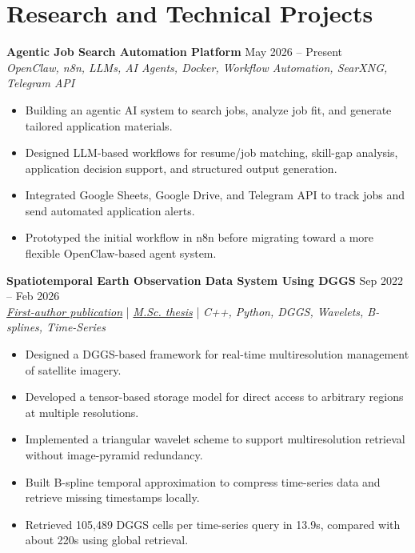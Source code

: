 \documentclass[a4paper,10pt]{article}
\begin{document}

\section*{Research and Technical Projects}

\noindent
\textbf{Agentic Job Search Automation Platform} \hfill May 2026 -- Present \\
\textit{OpenClaw, n8n, LLMs, AI Agents, Docker, Workflow Automation, SearXNG, Telegram API}
\begin{itemize}[leftmargin=0.25in]
    \item Building an agentic AI system to search jobs, analyze job fit, and generate tailored application materials.
    \item Designed LLM-based workflows for resume/job matching, skill-gap analysis, application decision support, and structured output generation.
    \item Integrated Google Sheets, Google Drive, and Telegram API to track jobs and send automated application alerts.
    \item Prototyped the initial workflow in n8n before migrating toward a more flexible OpenClaw-based agent system.
\end{itemize}

\noindent
\textbf{Spatiotemporal Earth Observation Data System Using DGGS} \hfill Sep 2022 -- Feb 2026 \\
\textit{\href{https://doi.org/10.3390/rs17040570}{First-author publication}} | \textit{\href{https://ucalgary.scholaris.ca/items/114b394b-e516-4732-bd3a-45dd6160d480}{M.Sc. thesis}} | \textit{C++, Python, DGGS, Wavelets, B-splines, Time-Series}
\begin{itemize}[leftmargin=0.25in]
    \item Designed a DGGS-based framework for real-time multiresolution management of satellite imagery.
    \item Developed a tensor-based storage model for direct access to arbitrary regions at multiple resolutions.
    \item Implemented a triangular wavelet scheme to support multiresolution retrieval without image-pyramid redundancy.
    \item Built B-spline temporal approximation to compress time-series data and retrieve missing timestamps locally.
    \item Retrieved 105,489 DGGS cells per time-series query in 13.9s, compared with about 220s using global retrieval.
\end{itemize}
\end{document}
